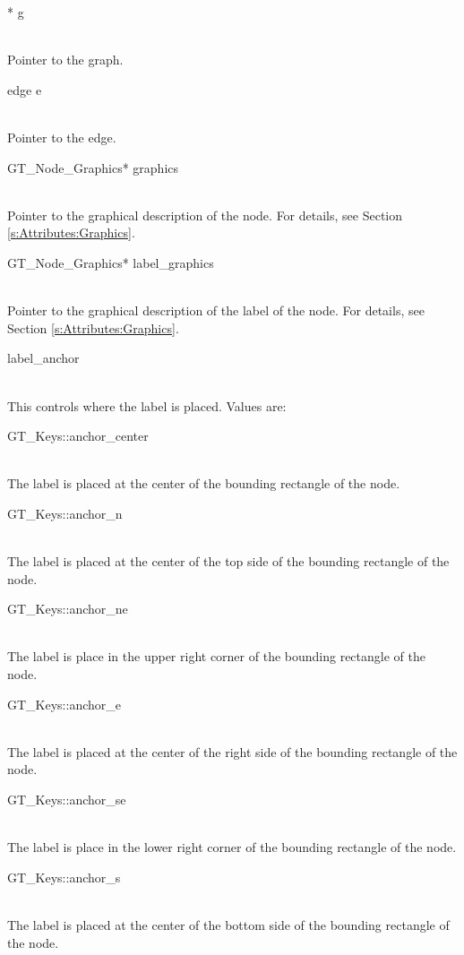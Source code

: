 \documentclass[twoside,fleqn]{report}
\begin{document}
\begin{CAttributes}
  
  \item[\GT{Graph}* g] \strut\\
  Pointer to the graph.

  \item[edge e] \strut\\
  Pointer to the edge.
  
  \item[GT\_Node\_Graphics* graphics] \strut\\
  Pointer to the graphical description of the node.  For details,
  see Section \ref{s:Attributes:Graphics}.
  
  \item[GT\_Node\_Graphics* label\_graphics] \strut\\
  Pointer to the graphical description of the label of the node.
  For details, see Section \ref{s:Attributes:Graphics}.
  
  \item[\GT{Key} label\_anchor] \strut\\
  This controls where the label is placed.  Values are:

  \begin{ttdescription}
    \item[GT\_Keys::anchor\_center] \strut\\
    The label is placed at the center of the bounding rectangle of the 
    node.

    \item[GT\_Keys::anchor\_n] \strut\\
    The label is placed at the center of the top side of the 
    bounding rectangle of the node.

    \item[GT\_Keys::anchor\_ne] \strut\\
    The label is place in the upper right corner of the bounding 
    rectangle of the node.

    \item[GT\_Keys::anchor\_e] \strut\\
    The label is placed at the center of the right side of the 
    bounding rectangle of the node.

    \item[GT\_Keys::anchor\_se] \strut\\
    The label is place in the lower right corner of the bounding 
    rectangle of the node.

    \item[GT\_Keys::anchor\_s] \strut\\
    The label is placed at the center of the bottom side of the 
    bounding rectangle of the node.


\end{ttdescription}
\end{CAttributes}
\end{document}
